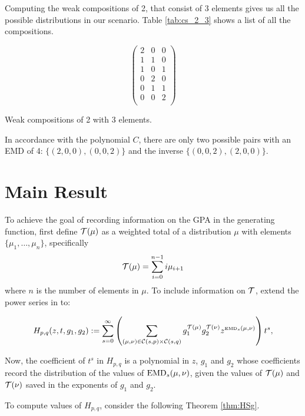 \documentclass[12pt,letterpaper,oneside,openany]{book}
\begin{document}
Computing the weak compositions of 2, that consist of 3 elements gives us all the possible distributions in our scenario. Table \ref{tab:cs_2_3} shows a list of all the compositions.

\begin{table}
	\centering
	
	$$\begin{pmatrix}
	2 & 0 & 0 \\
	1 & 1 & 0 \\
	1 & 0 & 1 \\
	0 & 2 & 0 \\
	0 & 1 & 1 \\
	0 & 0 & 2 \\
	\end{pmatrix}$$
	
	
	\caption{Weak compositions of 2 with 3 elements.}
	\label{tab:cs_2_3}
\end{table}



In accordance with the polynomial $C$, there are only two possible pairs with an EMD of 4: $\{(2, 0, 0), (0, 0, 2)\}$ and the inverse  $\{(0,0,2),(2,0,0)\}$.

\setcounter{section}{0}
\setcounter{chapter}{3}
\chapter{Main Result}
To achieve the goal of recording information on the GPA in the generating function, first define ${\mathcal{T}}(\mu)$  as a weighted total of a distribution $\mu$ with elements $\{\mu_1, …, \mu_n\}$, specifically
$${\mathcal{T}}(\mu) = \sum_{i=0}^{n-1}i\mu_{i+1}$$
where $n$ is the number of elements in $\mu$. 
To include information on ${\mathcal{T}}$, extend the power series in \cite{bourn2019expected} to:

\[
H_{p,q}(z,t, g_1, g_2) := \sum_{s=0}^\infty \left( \sum_{(\mu,\nu) \in {\mathcal{C}}(s,p) \times {\mathcal{C}}(s,q)}
g_1^{{\mathcal{T}}(\mu)}g_2^{{\mathcal{T}}(\nu)}z^{\tiny {\mbox{EMD}_s}(\mu,\nu)} \right) t^s,
\] 

Now, the coefficient of $t^s$ in $H_{p,q}$ is a polynomial in $z$, $g_1$ and $g_2$ whose coefficients record the distribution of  the values of ${\mbox{EMD}_s}(\mu, \nu)$, given the values of ${\mathcal{T}}(\mu)$ and ${\mathcal{T}}(\nu)$ saved in the exponents of $g_1$ and $g_2$.

To compute values of $H_{p,q}$, consider the following Theorem \ref{thm:HSg}.
\end{document}
